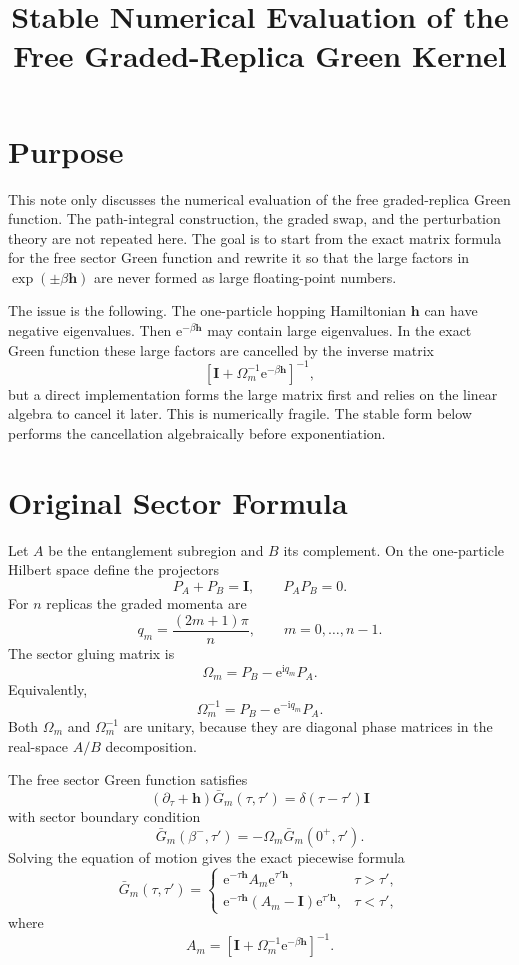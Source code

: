\documentclass[11pt]{article}
\title{Stable Numerical Evaluation of the Free Graded-Replica Green Kernel}
\author{}
\date{}
\newcommand{\ii}{\mathrm{i}}
\newcommand{\e}{\mathrm{e}}
\newcommand{\1}{\mathbb{1}}
\newcommand{\bI}{\mathbf{I}}
\newcommand{\bh}{\mathbf{h}}
\newcommand{\br}[1]{\left(#1\right)}
\newcommand{\sq}[1]{\left[#1\right]}
\begin{document}
\maketitle

\section{Purpose}

This note only discusses the numerical evaluation of the free
graded-replica Green function.  The path-integral construction, the graded
swap, and the perturbation theory are not repeated here.  The goal is to
start from the exact matrix formula for the free sector Green function and
rewrite it so that the large factors in
\(\exp(\pm \beta \bh)\) are never formed as large floating-point numbers.

The issue is the following.  The one-particle hopping Hamiltonian \(\bh\)
can have negative eigenvalues.  Then \(\e^{-\beta \bh}\) may contain large
eigenvalues.  In the exact Green function these large factors are cancelled
by the inverse matrix
\[
    \sq{\bI+\Omega_m^{-1}\e^{-\beta\bh}}^{-1},
\]
but a direct implementation forms the large matrix first and relies on the
linear algebra to cancel it later.  This is numerically fragile.  The stable
form below performs the cancellation algebraically before exponentiation.

\section{Original Sector Formula}

Let \(A\) be the entanglement subregion and \(B\) its complement.  On the
one-particle Hilbert space define the projectors
\[
    P_A+P_B=\bI,
    \qquad
    P_A P_B=0.
\]
For \(n\) replicas the graded momenta are
\[
    q_m=\frac{(2m+1)\pi}{n},
    \qquad
    m=0,\ldots,n-1.
\]
The sector gluing matrix is
\[
    \Omega_m = P_B-\e^{\ii q_m}P_A.
\]
Equivalently,
\[
    \Omega_m^{-1}=P_B-\e^{-\ii q_m}P_A.
\]
Both \(\Omega_m\) and \(\Omega_m^{-1}\) are unitary, because they are
diagonal phase matrices in the real-space \(A/B\) decomposition.

The free sector Green function satisfies
\[
    \br{\partial_\tau+\bh}\bar G_m(\tau,\tau')
    =
    \delta(\tau-\tau')\bI
\]
with sector boundary condition
\[
    \bar G_m(\beta^-,\tau')
    =
    -\Omega_m \bar G_m(0^+,\tau').
\]
Solving the equation of motion gives the exact piecewise formula
\[
    \bar G_m(\tau,\tau')
    =
    \begin{cases}
    \e^{-\tau\bh} A_m \e^{\tau'\bh},
    & \tau>\tau',
    \\[4pt]
    \e^{-\tau\bh} \br{A_m-\bI}\e^{\tau'\bh},
    & \tau<\tau',
    \end{cases}
\]
where
\[
    A_m =
    \sq{\bI+\Omega_m^{-1}\e^{-\beta\bh}}^{-1}.
\]
\end{document}

